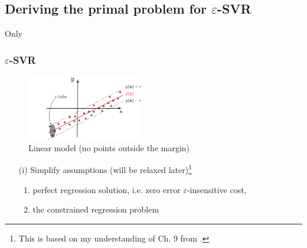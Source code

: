 \subsection{Deriving the primal problem for $\varepsilon$-SVR}

\begin{frame}{Only}\frametitle{$\varepsilon$-SVR}

\begin{figure}[h]
     \centering
	 \includegraphics[width=0.45\textwidth]{img/regression_1d_linear_margin}%
     \caption{Linear model (no points outside the margin)}
	 \label{fig:model_margin}
\end{figure}

\slidesonly{\vspace{-5mm}}

\begin{itemize}
\item[(i)]
Simplify assumptions (will be relaxed later){\footnote{This is based on my understanding of Ch. 9 from \citep{scholkopf2001learning}.}}

\begin{enumerate}
    \item<only@1-> perfect regression solution, i.e. zero error $\varepsilon$-insensitive cost,
    \item<only@2,3> the constrained regression problem\\
\end{enumerate}
\end{itemize}
\end{frame}
